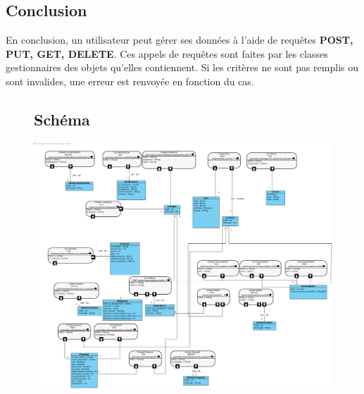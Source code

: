 \subsection{Conclusion}
\begin{flushleft}
En conclusion, un utilisateur peut gérer ses données à l'aide de requêtes \textbf{POST, PUT, GET, DELETE}. Ces appels de requêtes sont faites par les classes gestionnaires des objets qu'elles contiennent. Si les critères ne sont pas remplis ou sont invalides, une erreur est renvoyée en fonction du cas.
\newpage

\end{flushleft}
\begin{figure}[h]
\subsection{Schéma}
\includegraphics[width = 1.3\textwidth]{Base/apirest/img/apirest.png}
\end{figure}


